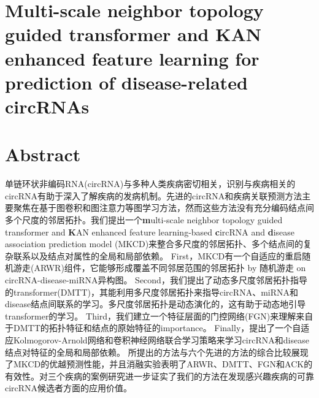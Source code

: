 \documentclass{bioinfo}
\begin{document}
\begin{methods}
\section*{Multi-scale neighbor topology guided transformer and KAN enhanced feature learning for prediction of disease-related circRNAs}

\section{Abstract}
单链环状非编码RNA(circRNA)与多种人类疾病密切相关，识别与疾病相关的circRNA有助于深入了解疾病的发病机制。先进的circRNA和疾病关联预测方法主要聚焦在基于图卷积和图注意力等图学习方法，然而这些方法没有充分编码结点间多个尺度的邻居拓扑。我们提出一个\textbf{m}ulti-scale neighbor topology guided transformer and \textbf{K}AN enhanced feature learning-based \textbf{c}ircRNA and \textbf{d}isease association prediction model (MKCD)来整合多尺度的邻居拓扑、多个结点间的复杂联系以及结点对属性的全局和局部依赖。
First，MKCD有一个自适应的重启随机游走(ARWR)组件，它能够形成覆盖不同邻居范围的邻居拓扑 by 随机游走 on circRNA-disease-miRNA异构图。
Second，我们提出了动态多尺度邻居拓扑指导的transformer(DMTT)，其能利用多尺度邻居拓扑来指导circRNA、miRNA和disease结点间联系的学习。多尺度邻居拓扑是动态演化的，这有助于动态地引导transformer的学习。
Third，我们建立一个特征层面的门控网络(FGN)来理解来自于DMTT的拓扑特征和结点的原始特征的importance。
Finally，提出了一个自适应Kolmogorov-Arnold网络和卷积神经网络联合学习策略来学习circRNA和disease结点对特征的全局和局部依赖。
所提出的方法与六个先进的方法的综合比较展现了MKCD的优越预测性能，并且消融实验表明了ARWR、DMTT、FGN和ACK的有效性。对三个疾病的案例研究进一步证实了我们的方法在发现感兴趣疾病的可靠circRNA候选者方面的应用价值。



\end{methods}
\end{document}
